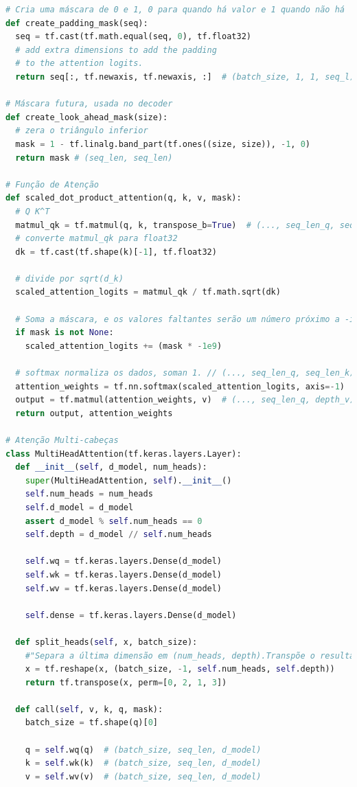 \begin{lstlisting}[language=Python, style=input]
# Cria uma máscara de 0 e 1, 0 para quando há valor e 1 quando não há
def create_padding_mask(seq):
  seq = tf.cast(tf.math.equal(seq, 0), tf.float32)
  # add extra dimensions to add the padding
  # to the attention logits.
  return seq[:, tf.newaxis, tf.newaxis, :]  # (batch_size, 1, 1, seq_l)

# Máscara futura, usada no decoder
def create_look_ahead_mask(size):
  # zera o triângulo inferior
  mask = 1 - tf.linalg.band_part(tf.ones((size, size)), -1, 0)
  return mask # (seq_len, seq_len)

# Função de Atenção
def scaled_dot_product_attention(q, k, v, mask):
  # Q K^T
  matmul_qk = tf.matmul(q, k, transpose_b=True)  # (..., seq_len_q, seq_len_k)
  # converte matmul_qk para float32
  dk = tf.cast(tf.shape(k)[-1], tf.float32)

  # divide por sqrt(d_k)
  scaled_attention_logits = matmul_qk / tf.math.sqrt(dk)

  # Soma a máscara, e os valores faltantes serão um número próximo a -inf
  if mask is not None:
    scaled_attention_logits += (mask * -1e9)

  # softmax normaliza os dados, soman 1. // (..., seq_len_q, seq_len_k)
  attention_weights = tf.nn.softmax(scaled_attention_logits, axis=-1)
  output = tf.matmul(attention_weights, v)  # (..., seq_len_q, depth_v)
  return output, attention_weights

# Atenção Multi-cabeças
class MultiHeadAttention(tf.keras.layers.Layer):
  def __init__(self, d_model, num_heads):
    super(MultiHeadAttention, self).__init__()
    self.num_heads = num_heads
    self.d_model = d_model
    assert d_model % self.num_heads == 0
    self.depth = d_model // self.num_heads

    self.wq = tf.keras.layers.Dense(d_model)
    self.wk = tf.keras.layers.Dense(d_model)
    self.wv = tf.keras.layers.Dense(d_model)

    self.dense = tf.keras.layers.Dense(d_model)

  def split_heads(self, x, batch_size):
    #"Separa a última dimensão em (num_heads, depth).Transpõe o resultado para o shape (batch_size, num_heads, seq_len, depth)"
    x = tf.reshape(x, (batch_size, -1, self.num_heads, self.depth))
    return tf.transpose(x, perm=[0, 2, 1, 3])

  def call(self, v, k, q, mask):
    batch_size = tf.shape(q)[0]

    q = self.wq(q)  # (batch_size, seq_len, d_model)
    k = self.wk(k)  # (batch_size, seq_len, d_model)
    v = self.wv(v)  # (batch_size, seq_len, d_model)


\end{lstlisting}
